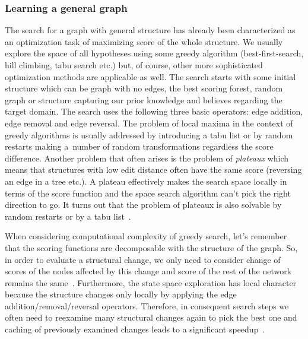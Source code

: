 \documentclass[english,cover]{fitthesis} %
\newcommand{\term}[1]{\emph{#1}}           %
\begin{document}
\subsubsection{Learning a general graph}
The search for a graph with general structure has already been characterized as an optimization task of maximizing score of the whole structure. We usually explore the space of all hypotheses using some greedy algorithm (best-first-search, hill climbing, tabu search etc.) but, of course, other more sophisticated optimization methods are applicable as well. The search starts with some initial structure which can be graph with no edges, the best scoring forest, random graph or structure capturing our prior knowledge and believes regarding the target domain. The search uses the following three basic operators: edge addition, edge removal and edge reversal. The problem of local maxima in the context of greedy algorithms is usually addressed by introducing a tabu list or by random restarts making a~number of random transformations regardless the score difference. Another problem that often arises is the problem of \term{plateaux} which means that structures with low edit distance often have the same score (reversing an edge in a tree etc.). A plateau effectively makes the search space locally  in terms of the score function and the space search algorithm can't pick the right direction to go. It turns out that the problem of plateaux is also solvable by random restarts or by a tabu list~\cite[p.~815]{pgm}.

When considering computational complexity of greedy search, let's remember that the scoring functions are decomposable with the structure of the graph. So, in order to evaluate a structural change, we only need to consider change of scores of the nodes affected by this change and score of the rest of the network remains the same~\cite[p.~818]{pgm}. Furthermore, the state space exploration has local character because the structure changes only locally by applying the edge addition/removal/reversal operators. Therefore, in consequent search steps we often need to reexamine many structural changes again to pick the best one and caching of previously examined changes leads to a significant speedup~\cite[p.~819]{pgm}.
\end{document}

